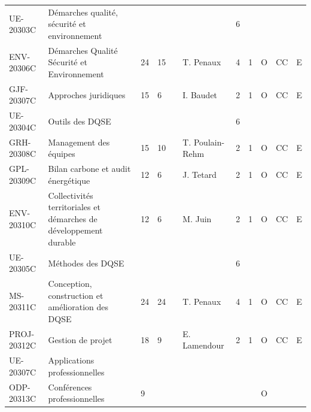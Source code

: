 \documentclass[a4paper,11pt]{article}
\begin{document}
{{\begin{tabular}{lllllllllll}
\rowcolor[HTML]{C0C0C0} 
UE-20303C     & Démarches qualité, sécurité et environnement                      &    &    &    &                 & 6    &      &             &                &           \\
ENV-20306C    & Démarches Qualité Sécurité et Environnement                       & 24 & 15 &    & T. Penaux       & 4    & 1    & O           & CC             & E         \\
GJF-20307C    & Approches juridiques                                              & 15 & 6  &    & I. Baudet       & 2    & 1    & O           & CC             & E         \\
\rowcolor[HTML]{C0C0C0} 
UE-20304C     & Outils des DQSE                                                   &    &    &    &                 & 6    &      &             &                &           \\
GRH-20308C    & Management des équipes                                            & 15 & 10 &    & T. Poulain-Rehm & 2    & 1    & O           & CC             & E         \\
GPL-20309C    & Bilan carbone et audit énergétique                                & 12 & 6  &    & J. Tetard       & 2    & 1    & O           & CC             & E         \\
ENV-20310C    & Collectivités territoriales et démarches de développement durable & 12 & 6  &    & M. Juin         & 2    & 1    & O           & CC             & E         \\
\rowcolor[HTML]{C0C0C0} 
UE-20305C     & Méthodes des DQSE                                                 &    &    &    &                 & 6    &      &             &                &           \\
MS-20311C     & Conception, construction et amélioration des DQSE                 & 24 & 24 &    & T. Penaux       & 4    & 1    & O           & CC             & E         \\
PROJ-20312C   & Gestion de projet                                                 & 18 & 9  &    & E. Lamendour    & 2    & 1    & O           & CC             & E         \\
\rowcolor[HTML]{C0C0C0} 
UE-20307C     & Applications professionnelles                                     &    &    &    &                 &      &      &             &                &           \\
ODP-20313C    & Conférences professionnelles                                      & 9  &    &    &                 &      &      & O           &                &           \\

\end{tabular}}}
\end{document}
